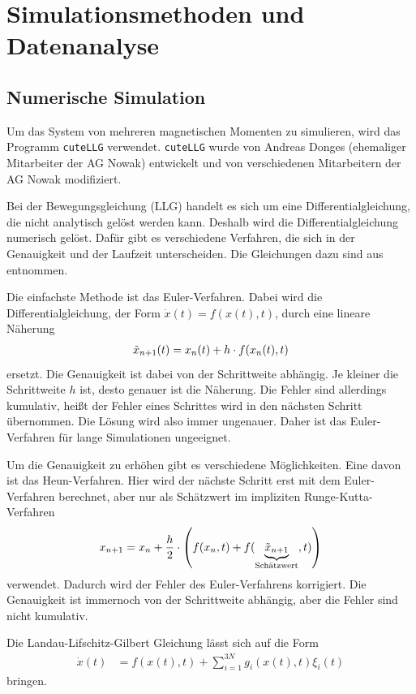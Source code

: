 \documentclass[main.tex]{subfiles}
\begin{document}
\newpage
\section{Simulationsmethoden und Datenanalyse}

\subsection{Numerische Simulation}
Um das System von mehreren magnetischen Momenten zu simulieren, wird das Programm \texttt{cuteLLG}\cite{cuteLLG} verwendet. \texttt{cuteLLG} wurde von Andreas Donges (ehemaliger Mitarbeiter der AG Nowak) entwickelt und von verschiedenen Mitarbeitern der AG Nowak modifiziert.


Bei der Bewegungsgleichung (LLG) handelt es sich um eine Differentialgleichung, die nicht analytisch gelöst werden kann.
Deshalb wird die Differentialgleichung numerisch gelöst. Dafür gibt es verschiedene Verfahren, die sich in der Genauigkeit und der Laufzeit unterscheiden. 
Die Gleichungen dazu sind aus \cite{Computerphysik} entnommen.

Die einfachste Methode ist das Euler-Verfahren. Dabei wird die
Differentialgleichung, der Form \(\Dot{x}(t) = f(x(t),t)\), durch eine lineare Näherung 
\begin{align}
    \Tilde{x}_{n+1}(t) = x_n(t) + h \cdot f(x_n(t),t)
\end{align}
ersetzt. Die Genauigkeit ist dabei von der Schrittweite abhängig. Je kleiner die Schrittweite \(h\) ist, desto genauer ist die Näherung. 
Die Fehler sind allerdings kumulativ, heißt der Fehler eines Schrittes wird in den nächsten Schritt übernommen. Die Lösung wird also immer ungenauer.
Daher ist das Euler-Verfahren für lange Simulationen ungeeignet.

Um die Genauigkeit zu erhöhen gibt es verschiedene Möglichkeiten. Eine davon ist das Heun-Verfahren. Hier wird der nächste Schritt erst mit dem Euler-Verfahren berechnet, aber nur als Schätzwert im impliziten Runge-Kutta-Verfahren 
\begin{align}
    x_{n+1} = x_n + \frac{h}{2} \cdot \qty(f(x_n,t) + f(\underbrace{\Tilde{x}_{n+1}}_\text{Schätzwert},t))
\end{align}
verwendet. Dadurch wird der Fehler des Euler-Verfahrens korrigiert. Die Genauigkeit ist immernoch von der Schrittweite abhängig, aber die Fehler sind nicht kumulativ.

Die Landau-Lifschitz-Gilbert Gleichung lässt sich auf die Form
\begin{align}
    \Dot{x}(t) &= f(x(t),t) + \sum_{i=1}^{3N} g_i(x(t),t) \xi_i(t)
\end{align}
bringen. 
\end{document}
